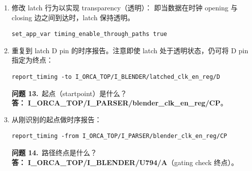 \begin{enumerate}
\begin{noteBox}
此时路径起点将为 latch 的 D pin（而非先前使用的 clock pin），
因为你关注的是包含 time borrow 的时序路径。
\end{noteBox}

\begin{lstlisting}
pt_shell> report_timing -from \
    I_ORCA_TOP/I_BLENDER/latched_clk_en_reg/D
\end{lstlisting}

\begin{questionBox}
\textbf{问题 12.}\ 给予 path segment \#1 的时间是否符合你的预期？\\[0.35em]
\textbf{答：} 是——path segment \#2 时序报告中给予起点的时间，
与 path segment \#1 时序报告中借用的 time borrow 一致。
\begin{lstlisting}
pt_shell> report_timing -from I_ORCA_TOP/I_BLENDER/latched_clk_en_reg/D
pt_shell> report_timing -to I_ORCA_TOP/I_BLENDER/latched_clk_en_reg/D
\end{lstlisting}
\end{questionBox}

  \item 修改 latch 行为以实现 transparency（透明）：
        即当数据在时钟 opening 与 closing 边之间到达时，latch 保持透明。
\begin{lstlisting}
set_app_var timing_enable_through_paths true
\end{lstlisting}

  \item 重复到 latch D pin 的时序报告。注意即使 latch 处于透明状态，仍可将 D pin 指定为终点：
\begin{lstlisting}
report_timing -to I_ORCA_TOP/I_BLENDER/latched_clk_en_reg/D
\end{lstlisting}

\begin{questionBox}
\textbf{问题 13.}\ 起点（startpoint）是什么？\\[0.35em]
\textbf{答：} \textbf{I\_ORCA\_TOP/I\_PARSER/blender\_clk\_en\_reg/CP}。
\end{questionBox}

  \item 从刚识别的起点做时序报告：
\begin{lstlisting}
report_timing -from I_ORCA_TOP/I_PARSER/blender_clk_en_reg/CP
\end{lstlisting}

\begin{questionBox}
\textbf{问题 14.}\ 路径终点是什么？\\[0.35em]
\textbf{答：} \textbf{I\_ORCA\_TOP/I\_BLENDER/U794/A}（gating check 终点）。


\end{questionBox}
\end{enumerate}
